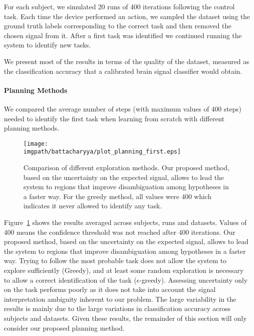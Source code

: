 For each subject, we simulated 20 runs of 400 iterations following the control task. Each time the device performed an action, we sampled the dataset using the ground truth labels corresponding to the correct task and then removed the chosen signal from it. After a first task was identified we continued running the system to identify new tasks. 

We present most of the results in terms of the quality of the dataset, measured as the classification accuracy that a calibrated brain signal classifier would obtain.

\paragraph{Planning Methods}

We compared the average number of steps (with maximum values of 400 steps) needed to identify the first task when learning from scratch with different planning methods.

\begin{figure}[!ht]
    \centering
    \texttt{[image: \\imgpath/battacharyya/plot\_planning\_first.eps]}
    \caption{Comparison of different exploration methods. Our proposed method, based on the uncertainty on the expected signal, allows to lead the system to regions that improve disambiguation among hypotheses in a faster way. For the greedy method, all values were 400 which indicates it never allowed to identify any task.}
    \label{fig:overlapcompplan}
\end{figure}

Figure~\ref{fig:overlapcompplan} shows the results averaged across subjects, runs and datasets. Values of 400 means the confidence threshold was not reached after 400 iterations. Our proposed method, based on the uncertainty on the expected signal, allows to lead the system to regions that improve disambiguation among hypotheses in a faster way. Trying to follow the most probable task does not allow the system to explore sufficiently (Greedy), and at least some random exploration is necessary to allow a correct identification of the task ($\epsilon$-greedy). Assessing uncertainty only on the task performs poorly as it does not take into account the signal interpretation ambiguity inherent to our problem. The large variability in the results is mainly due to the large variations in classification accuracy across subjects and datasets. Given these results, the remainder of this section will only consider our proposed planning method.

